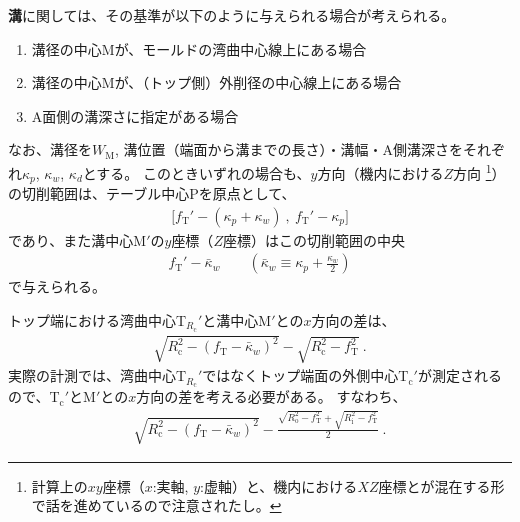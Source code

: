 




\textbf{溝}に関しては、その基準が以下のように与えられる場合が考えられる。
\begin{enumerate}
\item {}溝径の中心Mが、モールドの湾曲中心線上にある場合
\item {}溝径の中心Mが、（トップ側）外削径の中心線上にある場合
\item {}A面側の溝深さに指定がある場合
\end{enumerate}
なお、溝径を$W_\mathrm M$, 溝位置（端面から溝までの長さ）・溝幅・A側溝深さをそれぞれ$\kappa_p$, $\kappa_w$, $\kappa_d$とする。
このときいずれの場合も、$y$方向（機内における$Z$方向
\footnote{計算上の$xy$座標（$x$:実軸, $y$:虚軸）と、機内における$XZ$座標とが混在する形で話を進めているので注意されたし。}）
の切削範囲は、テーブル中心Pを原点として、
\begin{align*}
  \big[f_\mathrm T'-(\kappa_p+\kappa_w)\ ,\ f_\mathrm T'-\kappa_p\big]
\end{align*}
であり、また溝中心M$'$の$y$座標（$Z$座標）はこの切削範囲の中央
\begin{align}
  \label{eq:mizocenterZ}
  f_\mathrm T'-\bar\kappa_w \qquad
  \left(\bar\kappa_w \equiv \kappa_p+\frac{\kappa_w}2\right)
\end{align}
で与えられる。



トップ端における湾曲中心T$_{R_\mathrm c}'$と溝中心M$'$との$x$方向の差は、
\begin{align*}
  \sqrt{R_\mathrm c^2-\left(f_\mathrm T-\bar\kappa_w\right)^{\!2}}
  -\sqrt{R_\mathrm c^2-f_\mathrm T^2}\ .
\end{align*}
実際の計測では、湾曲中心T$_{R_\mathrm c}'$ではなくトップ端面の外側中心T$_\mathrm c'$が測定されるので、T$_\mathrm c'$とM$'$との$x$方向の差を考える必要がある。
すなわち、
\begin{align}
  \label{eq:difTopMizoCenter}
  \sqrt{R_\mathrm c^2-\left(f_\mathrm T-\bar\kappa_w\right)^{\!2}}
  -\frac{\sqrt{R_\mathrm o^2-f_\mathrm T^2}+\sqrt{R_\mathrm i^2-f_\mathrm T^2}}2\ .
\end{align}




